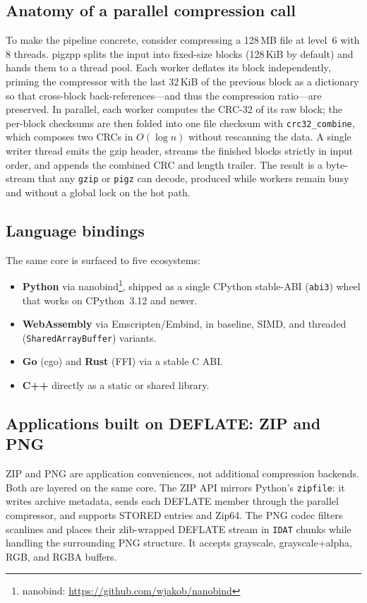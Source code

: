\documentclass{pigzpp-whitepaper}
\begin{document}
\subsection{Anatomy of a parallel compression call}
To make the pipeline concrete, consider compressing a 128\,MB file at level~6
with 8 threads. pigzpp splits the input into fixed-size blocks (128\,KiB by
default) and hands them to a thread pool. Each worker deflates its block
independently, priming the compressor with the last 32\,KiB of the previous
block as a dictionary so that cross-block back-references---and thus the
compression ratio---are preserved. In parallel, each worker computes the CRC-32
of its raw block; the per-block checksums are then folded into one file checksum
with \texttt{crc32\_combine}, which composes two CRCs in $O(\log n)$ without
rescanning the data. A single writer thread emits the gzip header, streams the
finished blocks strictly in input order, and appends the combined CRC and length
trailer. The result is a byte-stream that any \texttt{gzip} or \texttt{pigz} can
decode, produced while workers remain busy and without a global lock on the hot
path.
\subsection{Language bindings}
The same core is surfaced to five ecosystems:
\begin{itemize}
  \item \textbf{Python} via nanobind\footnote{nanobind:
  \url{https://github.com/wjakob/nanobind}}, shipped as a single
  CPython stable-ABI (\texttt{abi3}) wheel that works on CPython~3.12 and newer.
  \item \textbf{WebAssembly} via Emscripten/Embind, in baseline, SIMD, and
  threaded (\texttt{SharedArrayBuffer}) variants.
  \item \textbf{Go} (cgo) and \textbf{Rust} (FFI) via a stable C ABI.
  \item \textbf{C++} directly as a static or shared library.
\end{itemize}

\subsection{Applications built on DEFLATE: ZIP and PNG}
ZIP and PNG are application conveniences, not additional compression backends.
Both are layered on the same core. The ZIP API mirrors Python's
\texttt{zipfile}: it writes archive metadata, sends each DEFLATE member through
the parallel compressor, and supports STORED entries and Zip64. The PNG codec
filters scanlines and places their zlib-wrapped DEFLATE stream in \texttt{IDAT}
chunks while handling the surrounding PNG structure. It accepts grayscale,
grayscale+alpha, RGB, and RGBA buffers.
\end{document}
